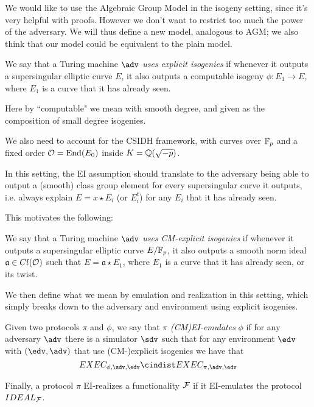 We would like to use the Algebraic Group Model in the isogeny setting, since it's very helpful with proofs. However we don't want to restrict too much the power of the adversary. We will thus define a new model, analogous to AGM; we also think that our model could be equivalent to the plain model.

\begin{definition}
    We say that a Turing machine $\adv$ \emph{uses explicit isogenies} if whenever it outputs a supersingular elliptic curve $E$, it also outputs a computable isogeny $\phi:E_1\to E$, where $E_1$ is a curve that it has already seen.
\end{definition}

Here by ``computable" we mean with smooth degree, and given as the composition of small degree isogenies.

We also need to account for the CSIDH framework, with curves over $\mathbb{F}_p$ and a fixed order $\mathcal{O}=\operatorname{End}(E_0)$ inside $K=\mathbb{Q}(\sqrt{-p})$.

In this setting, the EI assumption should translate to the adversary being able to output a (smooth) class group element for every supersingular curve it outputs, i.e. always explain $E=x\star E_i$ (or $E_i^t$) for any $E_i$ that it has already seen.

This motivates the following:

\begin{definition}
    We say that a Turing machine $\adv$ \emph{uses CM-explicit isogenies} if whenever it outputs a supersingular elliptic curve $E/\mathbb{F}_p$, it also outputs a smooth norm ideal $\mathfrak a\in Cl(\mathcal{O})$ such that $E=\mathfrak a\star E_1$, where $E_1$ is a curve that it has already seen, or its twist.
\end{definition}

We then define what we mean by emulation and realization in this setting, which simply breaks down to the adversary and environment using explicit isogenies.

\begin{definition}
        Given two protocols $\pi$ and $\phi$, we say that $\pi$ \emph{(CM)EI-emulates} $\phi$ if for any adversary $\adv$ there is a simulator $\sdv$ such that for any environment $\edv$ with $(\edv,\adv)$ that use (CM-)explicit isogenies we have that
    $$EXEC_{\phi,\sdv,\edv} \cindist EXEC_{\pi,\adv,\edv}$$
\end{definition}

Finally, a protocol $\pi$ EI-realizes a functionality $\mathcal{F}$ if it EI-emulates the protocol $IDEAL_{\mathcal{F}}$.





